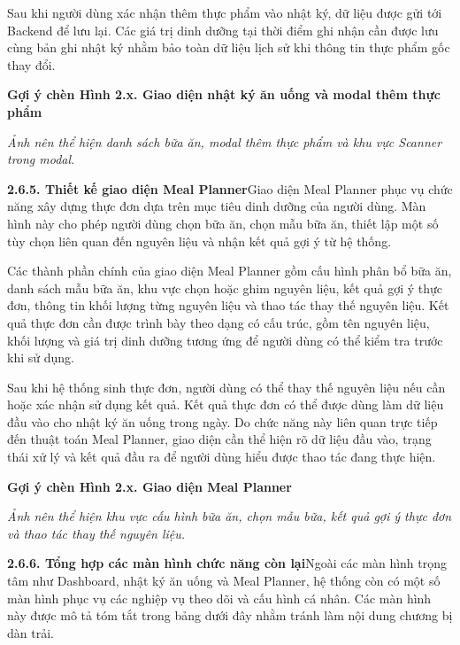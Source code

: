 Sau khi người dùng xác nhận thêm thực phẩm vào nhật ký, dữ liệu được gửi tới Backend để lưu lại. Các giá trị dinh dưỡng tại thời điểm ghi nhận cần được lưu cùng bản ghi nhật ký nhằm bảo toàn dữ liệu lịch sử khi thông tin thực phẩm gốc thay đổi.

\textbf{Gợi ý chèn Hình 2.x. Giao diện nhật ký ăn uống và modal thêm thực phẩm}

\textit{Ảnh nên thể hiện danh sách bữa ăn, modal thêm thực phẩm và khu vực Scanner trong modal.}

\textbf{2.6.5. Thiết kế giao diện Meal Planner}Giao diện Meal Planner phục vụ chức năng xây dựng thực đơn dựa trên mục tiêu dinh dưỡng của người dùng. Màn hình này cho phép người dùng chọn bữa ăn, chọn mẫu bữa ăn, thiết lập một số tùy chọn liên quan đến nguyên liệu và nhận kết quả gợi ý từ hệ thống.

Các thành phần chính của giao diện Meal Planner gồm cấu hình phân bổ bữa ăn, danh sách mẫu bữa ăn, khu vực chọn hoặc ghim nguyên liệu, kết quả gợi ý thực đơn, thông tin khối lượng từng nguyên liệu và thao tác thay thế nguyên liệu. Kết quả thực đơn cần được trình bày theo dạng có cấu trúc, gồm tên nguyên liệu, khối lượng và giá trị dinh dưỡng tương ứng để người dùng có thể kiểm tra trước khi sử dụng.

Sau khi hệ thống sinh thực đơn, người dùng có thể thay thế nguyên liệu nếu cần hoặc xác nhận sử dụng kết quả. Kết quả thực đơn có thể được dùng làm dữ liệu đầu vào cho nhật ký ăn uống trong ngày. Do chức năng này liên quan trực tiếp đến thuật toán Meal Planner, giao diện cần thể hiện rõ dữ liệu đầu vào, trạng thái xử lý và kết quả đầu ra để người dùng hiểu được thao tác đang thực hiện.

\textbf{Gợi ý chèn Hình 2.x. Giao diện Meal Planner}

\textit{Ảnh nên thể hiện khu vực cấu hình bữa ăn, chọn mẫu bữa, kết quả gợi ý thực đơn và thao tác thay thế nguyên liệu.}

\textbf{2.6.6. Tổng hợp các màn hình chức năng còn lại}Ngoài các màn hình trọng tâm như Dashboard, nhật ký ăn uống và Meal Planner, hệ thống còn có một số màn hình phục vụ các nghiệp vụ theo dõi và cấu hình cá nhân. Các màn hình này được mô tả tóm tắt trong bảng dưới đây nhằm tránh làm nội dung chương bị dàn trải.

